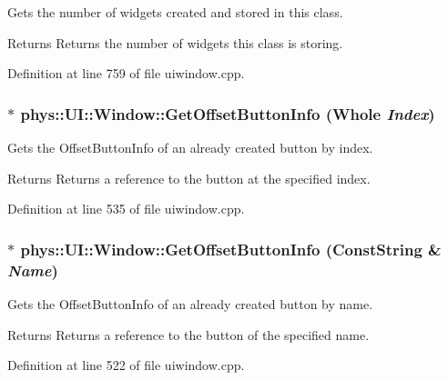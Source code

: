 Gets the number of widgets created and stored in this class. 

\begin{DoxyReturn}{Returns}
Returns the number of widgets this class is storing. 
\end{DoxyReturn}


Definition at line 759 of file uiwindow.cpp.

\hypertarget{classphys_1_1UI_1_1Window_aca8ae5c3dd73f101e33df8f1a2ff0f27}{
\subsubsection[{GetOffsetButtonInfo}]{ $\ast$ phys::UI::Window::GetOffsetButtonInfo ({\bf Whole} {\em Index})}}
\label{d4/d86/classphys_1_1UI_1_1Window_aca8ae5c3dd73f101e33df8f1a2ff0f27}


Gets the OffsetButtonInfo of an already created button by index. 

\begin{DoxyReturn}{Returns}
Returns a reference to the button at the specified index. 
\end{DoxyReturn}


Definition at line 535 of file uiwindow.cpp.

\hypertarget{classphys_1_1UI_1_1Window_ad0d6b12c2f69ea1bc580bba7e69949a5}{
\subsubsection[{GetOffsetButtonInfo}]{ $\ast$ phys::UI::Window::GetOffsetButtonInfo ({\bf ConstString} \& {\em Name})}}
\label{d4/d86/classphys_1_1UI_1_1Window_ad0d6b12c2f69ea1bc580bba7e69949a5}


Gets the OffsetButtonInfo of an already created button by name. 

\begin{DoxyReturn}{Returns}
Returns a reference to the button of the specified name. 
\end{DoxyReturn}


Definition at line 522 of file uiwindow.cpp.

